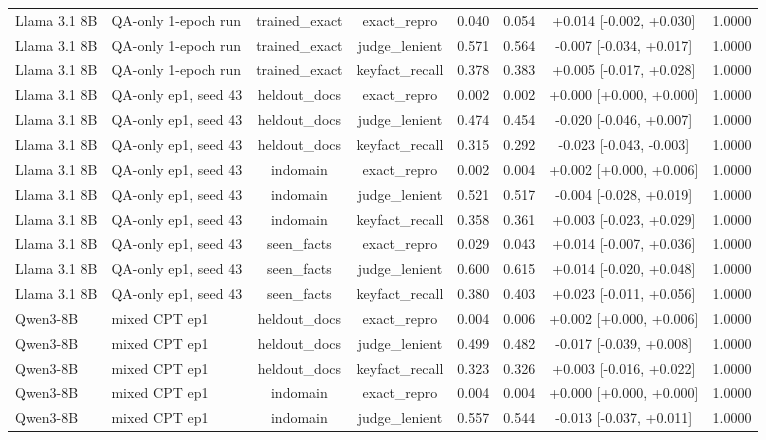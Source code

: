 \begin{table}[t]
{\begin{tabular}{llcccccc}
Llama 3.1 8B & QA-only 1-epoch run & trained\_exact & exact\_repro & 0.040 & 0.054 & +0.014 [-0.002, +0.030] & 1.0000 \\
Llama 3.1 8B & QA-only 1-epoch run & trained\_exact & judge\_lenient & 0.571 & 0.564 & -0.007 [-0.034, +0.017] & 1.0000 \\
Llama 3.1 8B & QA-only 1-epoch run & trained\_exact & keyfact\_recall & 0.378 & 0.383 & +0.005 [-0.017, +0.028] & 1.0000 \\
Llama 3.1 8B & QA-only ep1, seed 43 & heldout\_docs & exact\_repro & 0.002 & 0.002 & +0.000 [+0.000, +0.000] & 1.0000 \\
Llama 3.1 8B & QA-only ep1, seed 43 & heldout\_docs & judge\_lenient & 0.474 & 0.454 & -0.020 [-0.046, +0.007] & 1.0000 \\
Llama 3.1 8B & QA-only ep1, seed 43 & heldout\_docs & keyfact\_recall & 0.315 & 0.292 & -0.023 [-0.043, -0.003] & 1.0000 \\
Llama 3.1 8B & QA-only ep1, seed 43 & indomain & exact\_repro & 0.002 & 0.004 & +0.002 [+0.000, +0.006] & 1.0000 \\
Llama 3.1 8B & QA-only ep1, seed 43 & indomain & judge\_lenient & 0.521 & 0.517 & -0.004 [-0.028, +0.019] & 1.0000 \\
Llama 3.1 8B & QA-only ep1, seed 43 & indomain & keyfact\_recall & 0.358 & 0.361 & +0.003 [-0.023, +0.029] & 1.0000 \\
Llama 3.1 8B & QA-only ep1, seed 43 & seen\_facts & exact\_repro & 0.029 & 0.043 & +0.014 [-0.007, +0.036] & 1.0000 \\
Llama 3.1 8B & QA-only ep1, seed 43 & seen\_facts & judge\_lenient & 0.600 & 0.615 & +0.014 [-0.020, +0.048] & 1.0000 \\
Llama 3.1 8B & QA-only ep1, seed 43 & seen\_facts & keyfact\_recall & 0.380 & 0.403 & +0.023 [-0.011, +0.056] & 1.0000 \\
Qwen3-8B & mixed CPT ep1 & heldout\_docs & exact\_repro & 0.004 & 0.006 & +0.002 [+0.000, +0.006] & 1.0000 \\
Qwen3-8B & mixed CPT ep1 & heldout\_docs & judge\_lenient & 0.499 & 0.482 & -0.017 [-0.039, +0.008] & 1.0000 \\
Qwen3-8B & mixed CPT ep1 & heldout\_docs & keyfact\_recall & 0.323 & 0.326 & +0.003 [-0.016, +0.022] & 1.0000 \\
Qwen3-8B & mixed CPT ep1 & indomain & exact\_repro & 0.004 & 0.004 & +0.000 [+0.000, +0.000] & 1.0000 \\
Qwen3-8B & mixed CPT ep1 & indomain & judge\_lenient & 0.557 & 0.544 & -0.013 [-0.037, +0.011] & 1.0000 \\

\end{tabular}}
\end{table}
